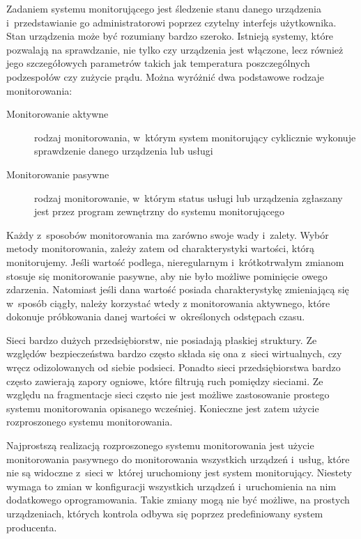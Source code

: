 Zadaniem systemu monitorującego jest śledzenie stanu danego urządzenia
i~przedstawianie go administratorowi poprzez czytelny interfejs
użytkownika. Stan urządzenia może być rozumiany bardzo
szeroko. Istnieją systemy, które pozwalają na sprawdzanie, nie tylko
czy urządzenia jest włączone, lecz również jego szczegółowych
parametrów takich jak temperatura poszczególnych podzespołów czy
zużycie prądu. Można wyróżnić dwa podstawowe rodzaje monitorowania:

\begin{description}
\item[Monitorowanie aktywne] rodzaj monitorowania, w~którym system
  monitorujący cyklicznie wykonuje sprawdzenie danego urządzenia lub
  usługi
\item[Monitorowanie pasywne] rodzaj monitorowanie, w~którym status
  usługi lub urządzenia zgłaszany jest przez program zewnętrzny do
  systemu monitorującego
\end{description}

Każdy z~sposobów monitorowania ma zarówno swoje wady i~zalety. Wybór
metody monitorowania, zależy zatem od charakterystyki wartości, którą
monitorujemy. Jeśli wartość podlega, nieregularnym i~krótkotrwałym
zmianom stosuje się monitorowanie pasywne, aby nie było możliwe
pominięcie owego zdarzenia. Natomiast jeśli dana wartość posiada
charakterystykę zmieniającą się w~sposób ciągły, należy korzystać
wtedy z monitorowania aktywnego, które dokonuje próbkowania danej
wartości w~określonych odstępach czasu.

Sieci bardzo dużych przedsiębiorstw, nie posiadają płaskiej
struktury. Ze względów bezpieczeństwa bardzo często składa się ona
z~sieci wirtualnych, czy wręcz odizolowanych od siebie
podsieci. Ponadto sieci przedsiębiorstwa bardzo często zawierają
zapory ogniowe, które filtrują ruch pomiędzy sieciami. Ze względu na
fragmentacje sieci często nie jest możliwe zastosowanie prostego
systemu monitorowania opisanego wcześniej. Konieczne jest zatem użycie
rozproszonego systemu monitorowania.

Najprostszą realizacją rozproszonego systemu monitorowania jest użycie
monitorowania pasywnego do monitorowania wszystkich urządzeń i~usług,
które nie są widoczne z~sieci w~której uruchomiony jest system
monitorujący. Niestety wymaga to zmian w konfiguracji wszystkich
urządzeń i~uruchomienia na nim dodatkowego oprogramowania. Takie
zmiany mogą nie być możliwe, na prostych urządzeniach, których
kontrola odbywa się poprzez predefiniowany system producenta.

